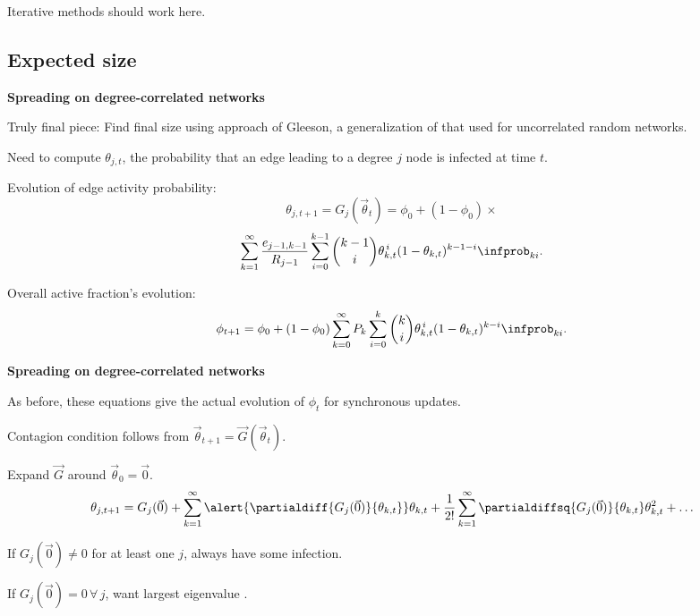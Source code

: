     Iterative methods should work here.
  


\subsection{Expected size}

  \textbf{Spreading on degree-correlated networks}

  
  
    \alert{Truly final piece:} 
    Find final size using approach of Gleeson\cite{gleeson2008a},
    a generalization of that used for uncorrelated random networks.
  
    Need to compute $\theta_{j,t}$, the probability that 
    an edge leading to a degree $j$ node is infected at time $t$.
  
    Evolution of edge activity probability:
    $$
    \theta_{j,t+1}
    =
    G_j(\vec{\theta}_t)
    =
    \phi_0 + 
    (1-\phi_0) \times
    $$
    $$
    \sum_{k=1}^{\infty}
    \frac{e_{j-1,k-1}}{R_{j-1}}
    \sum_{i=0}^{k-1}
    \binom{k-1}{i}
    \theta_{k,t}^{\, i}
    (1-\theta_{k,t})^{k-1-i}
    \infprob_{ki}.
    $$
   
    Overall active fraction's evolution:
    $$
    \phi_{t+1}
    =
    \phi_0
    +
    (1-\phi_0)
    \sum_{k=0}^{\infty}
    P_k
    \sum_{i=0}^{k}
    \binom{k}{i}
    \theta_{k,t}^{\, i}
    (1-\theta_{k,t})^{k-i}
    \infprob_{ki}.
    $$
  


  \textbf{Spreading on degree-correlated networks}

  
  
    As before, these equations give the actual evolution
    of $\phi_t$ for synchronous updates.
  
    Contagion condition follows from $\vec{\theta}_{t+1} = \vec{G}(\vec{\theta}_{t})$.
  
    Expand $\vec{G}$ around $\vec{\theta}_{0}=\vec{0}$.
    {
      $$
      \theta_{j,t+1} =
      G_j(\vec{0})
      + 
      \sum_{k=1}^\infty
      \alert{\partialdiff{G_j(\vec{0})}{\theta_{k,t}}}
      \theta_{k,t}
      +
      \frac{1}{2!}
      \sum_{k=1}^\infty
      \partialdiffsq{G_j(\vec{0})}{\theta_{k,t}}
      \theta_{k,t}^2
      +
      \ldots
      $$
    }
  
    If $G_j(\vec{0}) \ne 0$ for at least one $j$, always have some infection.
  
    If $G_j(\vec{0}) = 0 \, \forall \, j$, want largest eigenvalue
    .
   
